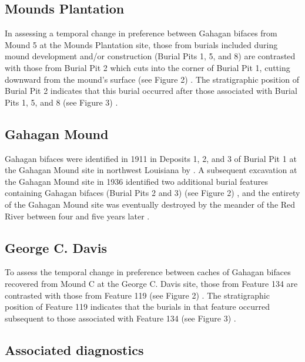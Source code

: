 \documentclass[]{interact}
\theoremstyle{plain}%
\theoremstyle{definition}
\theoremstyle{remark}
\begin{document}
\hypertarget{mounds-plantation}{%
\subsection{Mounds Plantation}\label{mounds-plantation}}

In assessing a temporal change in preference between Gahagan bifaces
from Mound 5 at the Mounds Plantation site, those from burials included
during mound development and/or construction (Burial Pits 1, 5, and 8)
are contrasted with those from Burial Pit 2 which cuts into the corner
of Burial Pit 1, cutting downward from the mound's surface (see Figure
2) \citep{RN8174}. The stratigraphic position of Burial Pit 2 indicates
that this burial occurred after those associated with Burial Pits 1, 5,
and 8 (see Figure 3) \citep{RN8174}.

\hypertarget{gahagan-mound}{%
\subsection{Gahagan Mound}\label{gahagan-mound}}

Gahagan bifaces were identified in 1911 in Deposits 1, 2, and 3 of
Burial Pit 1 at the Gahagan Mound site in northwest Louisiana by
\citet[Figures 18-19, 21]{RN7115}. A subsequent excavation at the
Gahagan Mound site in 1936 identified two additional burial features
containing Gahagan bifaces (Burial Pits 2 and 3) (see Figure 2)
\citep[Plate 27]{RN8176}, and the entirety of the Gahagan Mound site was
eventually destroyed by the meander of the Red River between four and
five years later \citep{RN10759}.

\hypertarget{george-c.-davis}{%
\subsection{George C. Davis}\label{george-c.-davis}}

To assess the temporal change in preference between caches of Gahagan
bifaces recovered from Mound C at the George C. Davis site, those from
Feature 134 are contrasted with those from Feature 119 (see Figure 2)
\citep{RN5746, RN8186}. The stratigraphic position of Feature 119
indicates that the burials in that feature occurred subsequent to those
associated with Feature 134 (see Figure 3) \citep{RN5746, RN8186}.

\hypertarget{associated-diagnostics}{%
\subsection{Associated diagnostics}\label{associated-diagnostics}}
\end{document}
